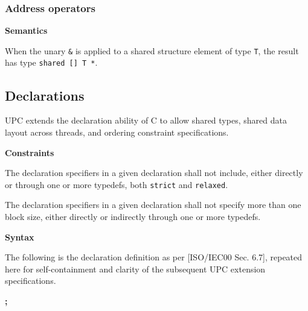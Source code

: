 \subsubsection{Address operators}

{\bf Semantics} 

\npf When the unary {\tt \&} is applied to a shared structure
    element of type {\tt T}, the result has type {\tt shared [] T *}.


\subsection{Declarations}

\npf UPC extends the declaration ability of C to allow shared
     types, shared data layout across threads, and ordering constraint
     specifications.

{\bf Constraints} 

\np The declaration specifiers in a given declaration shall
     not include, either directly or through one or more typedefs,
     both {\tt strict} and {\tt relaxed}.

 
\np The declaration specifiers in a given declaration shall
     not specify more than one block size, either directly or
     indirectly through one or more typedefs.

{\bf Syntax} 

\np The following is the declaration definition as per
    [ISO/IEC00 Sec. 6.7], repeated here for self-containment and
    clarity of the subsequent UPC extension specifications.


 {\bf ;}




